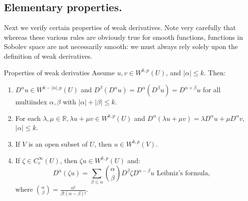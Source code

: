 \subsection{Elementary properties.}
Next we verify certain properties of weak derivatives. Note very carefully that whereas these various rules are obviously true for smooth functions, functions in Sobolev space are not necessarily smooth: we must always rely solely upon the definition of weak derivatives.
\begin{theorem}{Properties of weak derivaties}
  Assume $u,v\in W^{k,p}(U)$, and $|\alpha|\leq k$. Then:
  \begin{enumerate}
    \item $D^{\alpha}u\in W^{k-|\alpha|,p}(U)$ and $D^{\beta}(D^{\alpha}u)=D^{\alpha}(D^{\beta}u)=D^{\alpha+\beta}u$ for all multiindex $\alpha,\beta$ with $|\alpha|+|\beta|\leq k$.
    \item For each $\lambda,\mu\in\mathbb{R},\lambda u+\mu v\in W^{k,p}(U)$ and $D^{\alpha}(\lambda u+\mu v)=\lambda D^{\alpha}u+\mu D^{\alpha}v$, $|\alpha|\leq k$.
    \item If $V$ is an open subset of $U$, then $u\in W^{k,p}(V)$.
    \item If $\zeta\in C^{\infty}_{c}(U)$, then $\zeta u\in W^{k,p}(U)$ and:
    \begin{equation}
      D^{\alpha}(\zeta u)=\sum_{\beta\leq \alpha}\binom{\alpha}{\beta}D^{\beta}\zeta D^{\alpha-\beta}u \text{ Leibniz's formula},
    \end{equation}
    where $\binom{\alpha}{\beta}=\frac{\alpha!}{\beta!(\alpha-\beta)!}$.
  \end{enumerate}
\end{theorem}
